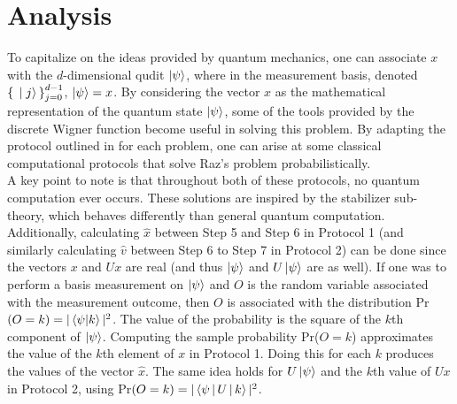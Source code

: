 \documentclass[../3Wworkreport.tex]{subfiles}
\begin{document}
\chapter{Analysis}
\label{chap:analysis}

To capitalize on the ideas provided by quantum mechanics, one can associate $x$ with the $d$-dimensional qudit $\ket{\psi}$, where in the measurement basis, denoted $\set{\ket{j}}_{j=0}^{d-1}$, $\ket{\psi}= x$. By considering the vector $x$ as the mathematical representation of the quantum state $\ket{\psi}$, some of the tools provided by the discrete Wigner function become useful in solving this problem. By adapting the protocol outlined in \cite{Pashayan2014} for each problem, one can arise at some classical computational protocols that solve Raz's problem probabilistically.\\

A key point to note is that throughout both of these protocols, no quantum computation ever occurs. These solutions are inspired by the stabilizer sub-theory, which behaves differently than general quantum computation. Additionally, calculating $\hat{x}$ between Step 5 and Step 6 in Protocol 1 (and similarly calculating $\hat{v}$ between Step 6 to Step 7 in Protocol 2) can be done since the vectors $x$ and $Ux$ are real (and thus $\ket{\psi}$ and $U\ket{\psi}$ are as well). If one was to perform a basis measurement on $\ket{\psi}$ and $O$ is the random variable associated with the measurement outcome, then $O$ is associated with the distribution Pr$(O = k) = |\braket{\psi|k}|^2$. The value of the probability is the square of the $k$th component of $\ket{\psi}$. Computing the sample probability Pr($O = k$) approximates the value of the $k$th element of $x$ in Protocol 1. Doing this for each $k$ produces the values of the vector $\hat{x}$. The same idea holds for $U\ket{\psi}$ and the $k$th value of $Ux$ in Protocol 2, using Pr$(O = k) = |\Braket{\psi |U|k}|^2$.
\end{document}
